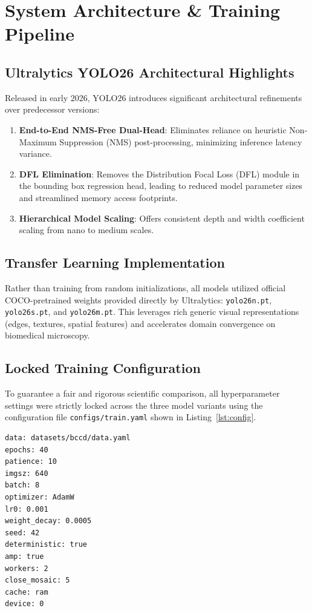 \documentclass[conference]{IEEEtran}
\begin{document}
\section{System Architecture \& Training Pipeline}

\subsection{Ultralytics YOLO26 Architectural Highlights}
Released in early 2026, YOLO26 introduces significant architectural refinements over predecessor versions:
\begin{enumerate}
    \item \textbf{End-to-End NMS-Free Dual-Head}: Eliminates reliance on heuristic Non-Maximum Suppression (NMS) post-processing, minimizing inference latency variance.
    \item \textbf{DFL Elimination}: Removes the Distribution Focal Loss (DFL) module in the bounding box regression head, leading to reduced model parameter sizes and streamlined memory access footprints.
    \item \textbf{Hierarchical Model Scaling}: Offers consistent depth and width coefficient scaling from nano to medium scales.
\end{enumerate}

\subsection{Transfer Learning Implementation}
Rather than training from random initializations, all models utilized official COCO-pretrained weights provided directly by Ultralytics: \texttt{yolo26n.pt}, \texttt{yolo26s.pt}, and \texttt{yolo26m.pt}. This leverages rich generic visual representations (edges, textures, spatial features) and accelerates domain convergence on biomedical microscopy.

\subsection{Locked Training Configuration}
To guarantee a fair and rigorous scientific comparison, all hyperparameter settings were strictly locked across the three model variants using the configuration file \texttt{configs/train.yaml} shown in Listing~\ref{lst:config}.

\begin{lstlisting}[language=bash, caption={Locked Training Configuration (configs/train.yaml)}, label={lst:config}]
data: datasets/bccd/data.yaml
epochs: 40
patience: 10
imgsz: 640
batch: 8
optimizer: AdamW
lr0: 0.001
weight_decay: 0.0005
seed: 42
deterministic: true
amp: true
workers: 2
close_mosaic: 5
cache: ram
device: 0
\end{lstlisting}
\end{document}
